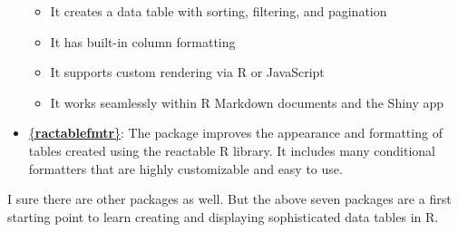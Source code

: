 \documentclass[
  letterpaper,
  DIV=11,
  numbers=noendperiod]{scrreprt}
\providecommand{\tightlist}{%
  \setlength{\itemsep}{0pt}\setlength{\parskip}{0pt}}\usepackage{longtable,booktabs,array}
\begin{document}
\begin{itemize}
  \begin{itemize}
  \tightlist
  \item
    It creates a data table with sorting, filtering, and pagination
  \item
    It has built-in column formatting
  \item
    It supports custom rendering via R or JavaScript
  \item
    It works seamlessly within R Markdown documents and the Shiny app
  \end{itemize}
\item
  \href{https://kcuilla.github.io/reactablefmtr/index.html}{\{\textbf{ractablefmtr}\}}:
  The package improves the appearance and formatting of tables created
  using the reactable R library. It includes many conditional formatters
  that are highly customizable and easy to use.
\end{itemize}

I sure there are other packages as well. But the above seven packages
are a first starting point to learn creating and displaying
sophisticated data tables in R.
\end{document}
